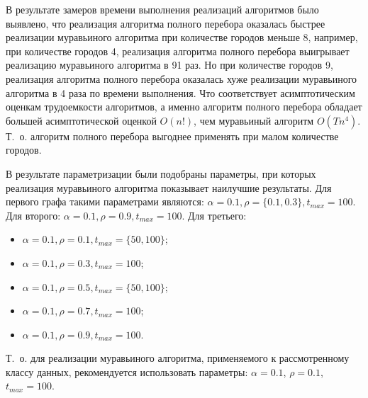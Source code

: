 В результате замеров времени выполнения реализаций алгоритмов было выявлено, что реализация алгоритма полного перебора оказалась быстрее реализации муравьиного алгоритма при количестве городов меньше 8, например, при количестве городов 4, реализация алгоритма полного перебора выигрывает реализацию муравьиного алгоритма в 91 раз. 
Но при количестве городов 9, реализация алгоритма полного перебора оказалась хуже реализации муравьиного алгоритма в 4 раза по времени выполнения.
Что соответствует асимптотическим оценкам трудоемкости алгоритмов, а именно алгоритм полного перебора обладает большей асимптотической оценкой $O(n!)$, чем муравьиный алгоритм $O(Tn^4)$.
Т.~о. алгоритм полного перебора выгоднее применять при малом количестве городов.

В результате параметризации были подобраны параметры, при которых реализация муравьиного алгоритма показывает наилучшие результаты. Для первого графа такими параметрами являются: $\alpha = 0.1, \rho = \{0.1, 0.3\}, t_{max}=100$. Для второго: $\alpha = 0.1, \rho = 0.9, t_{max}=100$. Для третьего:
\begin{itemize}
	\item $\alpha = 0.1, \rho = 0.1, t_{max}=\{50, 100\}$;
	\item $\alpha = 0.1, \rho = 0.3, t_{max}=100$;
	\item $\alpha = 0.1, \rho = 0.5, t_{max}=\{50, 100\}$;
	\item $\alpha = 0.1, \rho = 0.7, t_{max}=100$;
	\item $\alpha = 0.1, \rho = 0.9, t_{max}=100$.
\end{itemize}

Т.~о. для реализации муравьиного алгоритма, применяемого к рассмотренному классу данных, рекомендуется использовать параметры: $\alpha = 0.1$, $\rho = 0.1$, $t_{max} = 100$.